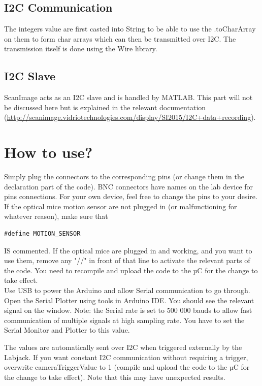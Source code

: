 \documentclass[a4paper]{article}
\begin{document}
\subsection{I2C Communication}
The integers value are first casted into String to be able to use the .toCharArray on them to form char arrays which can then be transmitted over I2C.
The transmission itself is done using the Wire library.

\subsection{I2C Slave}
ScanImage acts as an I2C slave and is handled by MATLAB. This part will not be discussed here but is explained in the relevant documentation (\url{http://scanimage.vidriotechnologies.com/display/SI2015/I2C+data+recording}).

\section{How to use?}
Simply plug the connectors to the corresponding pins (or change them in the declaration part of the code).
BNC connectors have names on the lab device for pins connections. For your own device, feel free to change the pins to your desire.\\

If the optical mice motion sensor are not plugged in (or malfunctioning for whatever reason), make sure that 
\begin{lstlisting}
#define MOTION_SENSOR
\end{lstlisting}
IS commented. 
If the optical mice are plugged in and working, and you want to use them, remove any "//" in front of that line to activate the relevant parts of the code. You need to recompile and upload the code to the µC for the change to take effect.\\

Use USB to power the Arduino and allow Serial communication to go through. Open the Serial Plotter using tools in Arduino IDE. You should see the relevant signal on the window.
Note: the Serial rate is set to 500 000 bauds to allow fast communication of multiple signals at high sampling rate. You have to set the Serial Monitor and Plotter to this value.

The values are automatically sent over I2C when triggered externally by the Labjack. If you want constant I2C communication without requiring a trigger, overwrite cameraTriggerValue to 1 (compile and upload the code to the µC for the change to take effect). Note that this may have unexpected results. 
\end{document}
